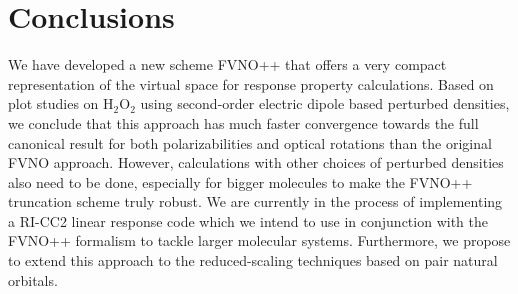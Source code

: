 \section{Conclusions}
We have developed a new scheme FVNO++ that offers a very 
compact representation of the virtual space for response 
property calculations. Based on plot studies on H$_2$O$_2$ using second-order 
electric dipole based perturbed densities, we conclude that this
approach has much faster convergence towards the full canonical result for both 
polarizabilities and optical rotations than the original FVNO approach.
However, calculations with other choices of perturbed densities also need to be 
done, especially for bigger molecules to make the FVNO++ truncation scheme truly robust. 
We are currently in the process of implementing a RI-CC2 linear response code which we intend 
to use in conjunction with the FVNO++ formalism to tackle larger molecular systems.
Furthermore, we propose to extend this approach to the reduced-scaling techniques based 
on pair natural orbitals\cite{Neese09,NeeseCCSD09}.

